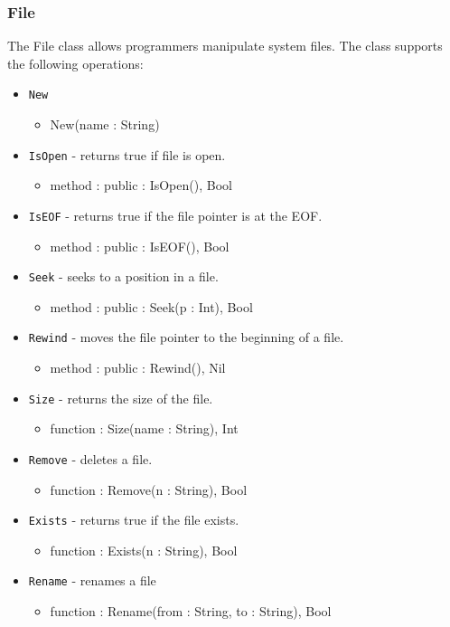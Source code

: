 \documentclass[12pt]{article}
\begin{document}
\subsubsection{File}
The File class allows programmers manipulate system files.    The class supports the following operations:
\begin{itemize}
    \item \texttt{New}
    	\begin{itemize}
	\item New(name : String)
	\end{itemize}
    \item \texttt{IsOpen} - returns true if file is open.
    	\begin{itemize}
	\item method : public : IsOpen(), Bool
	\end{itemize}
    \item \texttt{IsEOF} - returns true if the file pointer is at the EOF.
    	\begin{itemize}
	\item method : public : IsEOF(), Bool
	\end{itemize}
    \item \texttt{Seek} - seeks to a position in a file.
    	\begin{itemize}
	\item method : public : Seek(p : Int), Bool
	\end{itemize}
    \item \texttt{Rewind} - moves the file pointer to the beginning of a file.
    	\begin{itemize}
	\item method : public : Rewind(), Nil
	\end{itemize}
    \item \texttt{Size} - returns the size of the file.
    	\begin{itemize}
	\item function : Size(name : String), Int
	\end{itemize}
    \item \texttt{Remove} - deletes a file.
    	\begin{itemize}
	\item function : Remove(n : String), Bool
	\end{itemize}
    \item \texttt{Exists} - returns true if the file exists.
    	\begin{itemize}
	\item function : Exists(n : String), Bool
	\end{itemize}
    \item \texttt{Rename} - renames a file
    	\begin{itemize}
	\item function : Rename(from : String, to : String), Bool
	\end{itemize}
\end{itemize}
\end{document}
